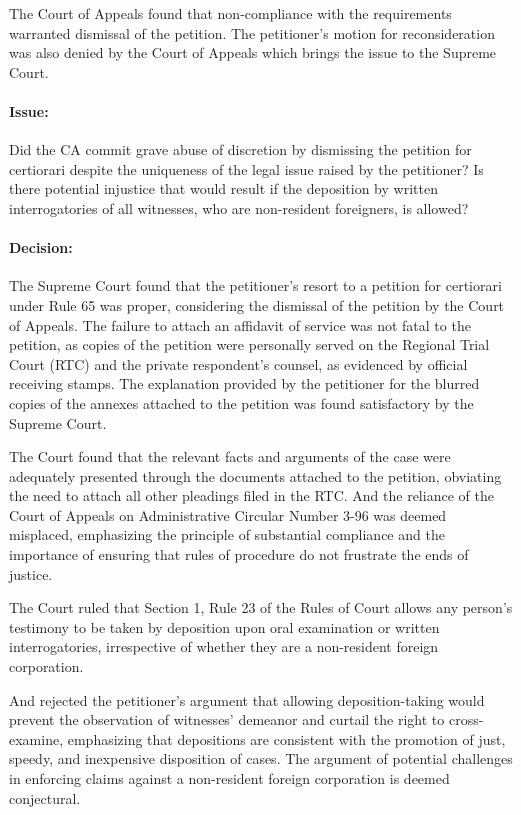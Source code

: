 \documentclass[
12pt,
oneside,
onehalfspacing,
headsepline
]{DigestCollection}
\begin{document}
The Court of Appeals found that non-compliance with the requirements warranted dismissal of the petition. The petitioner's motion for reconsideration was also denied by the Court of Appeals which brings the issue to the Supreme Court.

\paragraph{Issue:}
\label{e61311c0-09fd-11ef-932c-63c852f65e48}


Did the CA commit grave abuse of discretion by dismissing the petition for certiorari despite the uniqueness of the legal issue raised by the petitioner? Is there potential injustice that would result if the deposition by written interrogatories of all witnesses, who are non-resident foreigners, is allowed?

\paragraph{Decision:}
\label{e8edf720-09fd-11ef-932c-63c852f65e48}


The Supreme Court found that the petitioner's resort to a petition for certiorari under Rule 65 was proper, considering the dismissal of the petition by the Court of Appeals. The failure to attach an affidavit of service was not fatal to the petition, as copies of the petition were personally served on the Regional Trial Court (RTC) and the private respondent's counsel, as evidenced by official receiving stamps. The explanation provided by the petitioner for the blurred copies of the annexes attached to the petition was found satisfactory by the Supreme Court.

The Court found that the relevant facts and arguments of the case were adequately presented through the documents attached to the petition, obviating the need to attach all other pleadings filed in the RTC. And the reliance of the Court of Appeals on Administrative Circular Number 3-96 was deemed misplaced, emphasizing the principle of substantial compliance and the importance of ensuring that rules of procedure do not frustrate the ends of justice.

The Court ruled that Section 1, Rule 23 of the Rules of Court allows any person's testimony to be taken by deposition upon oral examination or written interrogatories, irrespective of whether they are a non-resident foreign corporation.

And rejected the petitioner's argument that allowing deposition-taking would prevent the observation of witnesses' demeanor and curtail the right to cross-examine, emphasizing that depositions are consistent with the promotion of just, speedy, and inexpensive disposition of cases. The argument of potential challenges in enforcing claims against a non-resident foreign corporation is deemed conjectural.
\end{document}
